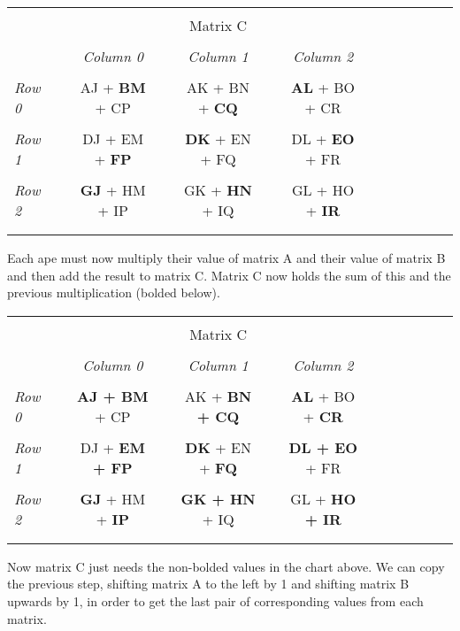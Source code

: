 \documentclass[10pt]{article}
\begin{document}
\begin{tabular}{l*{11}{c}r}
  \\
  \\
  && && Matrix C \\
  \\
  & &
  \textit{Column 0} &&
  \textit{Column 1} &&
  \textit{Column 2} \\
  \\
  \textit{Row 0} && AJ + \textbf{BM} + CP && AK + BN + \textbf{CQ} && \textbf{AL} + BO + CR \\
  \\
  \textit{Row 1} && DJ + EM + \textbf{FP} && \textbf{DK} + EN + FQ && DL + \textbf{EO} + FR \\
  \\
  \textit{Row 2} && \textbf{GJ} + HM + IP && GK + \textbf{HN} + IQ && GL + HO + \textbf{IR} \\
  \\
  \\
\end{tabular}

Each ape must now multiply their value of matrix A and their value of matrix B and then add the result to matrix C.  Matrix C now holds the sum of this and the previous multiplication (bolded below). \par

\begin{tabular}{l*{11}{c}r}
  \\
  \\
  && && Matrix C \\
  \\
  & &
  \textit{Column 0} &&
  \textit{Column 1} &&
  \textit{Column 2} \\
  \\
  \textit{Row 0} && \textbf{AJ + BM} + CP && AK + \textbf{BN + CQ} && \textbf{AL} + BO + \textbf{CR} \\
  \\
  \textit{Row 1} && DJ + \textbf{EM + FP} && \textbf{DK} + EN + \textbf{FQ} && \textbf{DL + EO} + FR \\
  \\
  \textit{Row 2} && \textbf{GJ} + HM + \textbf{IP} && \textbf{GK + HN} + IQ && GL + \textbf{HO + IR} \\
  \\
  \\
\end{tabular}

Now matrix C just needs the non-bolded values in the chart above.  We can copy the previous step, shifting matrix A to the left by 1 and shifting matrix B upwards by 1, in order to get the last pair of corresponding values from each matrix. \par
\end{document}
